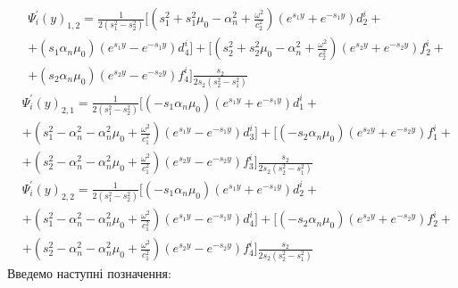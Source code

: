 \begin{align*}
    &\Psi_i^{'}(y)_{1,2}= \frac{1}{2 (s_1^2 - s_2^2)} [(s_1^2 + s_1^2 \mu_0 - \alpha_n^2 + \frac{\omega^2}{c_2^2}) (e^{s_1 y} + e^{-s_1 y}) d_2^i + \\
    &+ (s_1 \alpha_n \mu_0) (e^{s_1 y} - e^{-s_1 y}) d_4^i ]
    + [(s_2^2 + s_2^2 \mu_0 - \alpha_n^2 + \frac{\omega^2}{c_2^2}) (e^{s_2 y} + e^{-s_2 y}) f_2^i + \\
    &+ (s_2 \alpha_n \mu_0) (e^{s_2 y} - e^{-s_2 y}) f_4^i ] \frac{s_2}{2 s_2 (s_2^2 - s_1^2)}
\end{align*}
\begin{align*}
    &\Psi_i^{'}(y)_{2,1}= \frac{1}{2 (s_1^2 - s_2^2)} [(-s_1 \alpha_n \mu_0) (e^{s_1 y} + e^{-s_1 y}) d_1^i + \\
    &+ (s_1^2 - \alpha_n^2 - \alpha_n^2\mu_0 + \frac{\omega^2}{c_1^2}) (e^{s_1 y} - e^{-s_1 y}) d_3^i ]
    + [(-s_2 \alpha_n \mu_0) (e^{s_2 y} + e^{-s_2 y}) f_1^i + \\
    &+ (s_2^2 - \alpha_n^2 - \alpha_n^2\mu_0 + \frac{\omega^2}{c_1^2}) (e^{s_2 y} - e^{-s_2 y}) f_3^i ] \frac{s_2}{2 s_2 (s_2^2 - s_1^2)}
\end{align*}
\begin{align*}
    &\Psi_i^{'}(y)_{2,2}= \frac{1}{2 (s_1^2 - s_2^2)} [(-s_1 \alpha_n \mu_0) (e^{s_1 y} + e^{-s_1 y}) d_2^i + \\
    &+ (s_1^2 - \alpha_n^2 - \alpha_n^2\mu_0 + \frac{\omega^2}{c_1^2}) (e^{s_1 y} - e^{-s_1 y}) d_4^i ]
    + [(-s_2 \alpha_n \mu_0) (e^{s_2 y} + e^{-s_2 y}) f_2^i + \\
    &+ (s_2^2 - \alpha_n^2 - \alpha_n^2\mu_0 + \frac{\omega^2}{c_1^2}) (e^{s_2 y} - e^{-s_2 y}) f_4^i ] \frac{s_2}{2 s_2 (s_2^2 - s_1^2)}
\end{align*}
Введемо наступні позначення:

